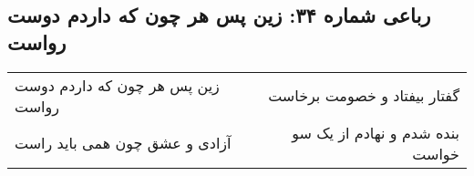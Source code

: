 \begin{center}
\section*{رباعی شماره ۳۴: زین پس هر چون که داردم دوست رواست}
\label{sec:sh034}
\begin{longtable}{l p{0.5cm} r}
زین پس هر چون که داردم دوست رواست
&&
گفتار بیفتاد و خصومت برخاست
\\
آزادی و عشق چون همی باید راست
&&
بنده شدم و نهادم از یک سو خواست
\\
\end{longtable}
\end{center}
